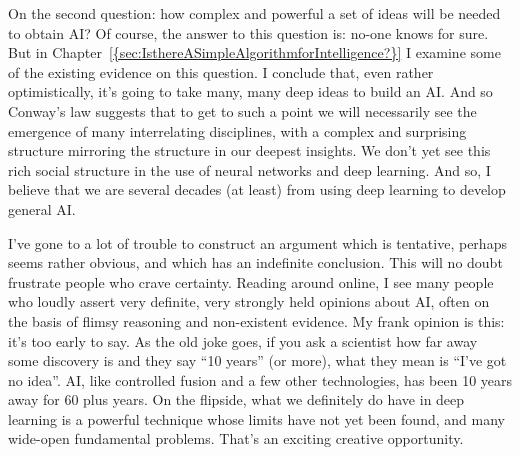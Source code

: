 On the second question: how complex and powerful a set of ideas will be needed to obtain AI? Of course, the answer to this question is: no-one knows for sure. But in Chapter~\ref{{sec:IsthereASimpleAlgorithmforIntelligence?}} I examine some of the existing evidence on this question. I conclude that, even rather optimistically, it's going to take many, many deep ideas to build an AI. And so Conway's law suggests that to get to such a point we will necessarily see the emergence of many interrelating disciplines, with a complex and surprising structure mirroring the structure in our deepest insights. We don't yet see this rich social structure in the use of neural networks and deep learning. And so, I believe that we are several decades (at least) from using deep learning to develop general AI.

I've gone to a lot of trouble to construct an argument which is tentative, perhaps seems rather obvious, and which has an indefinite conclusion. This will no doubt frustrate people who crave certainty. Reading around online, I see many people who loudly assert very definite, very strongly held opinions about AI, often on the basis of flimsy reasoning and non-existent evidence. My frank opinion is this: it's too early to say. As the old joke goes, if you ask a scientist how far away some discovery is and they say ``10 years'' (or more), what they mean is ``I've got no idea''. AI, like controlled fusion and a few other technologies, has been 10 years away for 60 plus years. On the flipside, what we definitely do have in deep learning is a powerful technique whose limits have not yet been found, and many wide-open fundamental problems. That's an exciting creative opportunity.


